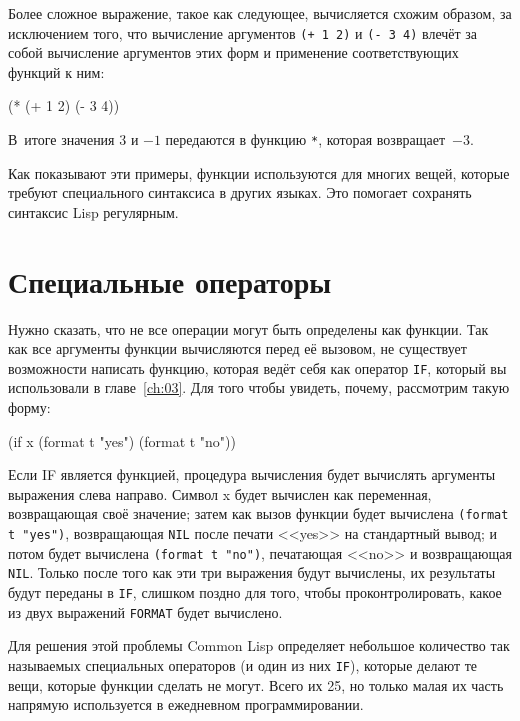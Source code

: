 Более сложное выражение, такое как следующее, вычисляется схожим образом, за исключением
того, что вычисление аргументов \lstinline{(+ 1 2)} и \lstinline{(- 3 4)} влечёт за собой
вычисление аргументов этих форм и применение соответствующих функций к ним:

\begin{myverb}
(* (+ 1 2) (- 3 4))
\end{myverb}

В~итоге значения $3$ и $-1$ передаются в функцию \lstinline{*}, которая возвращает~$-3$.

Как показывают эти примеры, функции используются для многих вещей, которые требуют
специального синтаксиса в других языках. Это помогает сохранять синтаксис Lisp регулярным.

\section{Специальные операторы}

Нужно сказать, что не все операции могут быть определены как функции. Так как все
аргументы функции вычисляются перед её вызовом, не существует возможности написать
функцию, которая ведёт себя как оператор \lstinline{IF}, который вы использовали в
главе~\ref{ch:03}. Для того чтобы увидеть, почему, рассмотрим такую форму:

\begin{myverb}
(if x (format t "yes") (format t "no"))
\end{myverb}

Если IF является функцией, процедура вычисления будет вычислять аргументы выражения слева
направо. Символ x будет вычислен как переменная, возвращающая своё значение; затем как
вызов функции будет вычислена \lstinline{(format t "yes")}, возвращающая \lstinline{NIL} после
печати <<yes>> на стандартный вывод; и потом будет вычислена \lstinline{(format t "no")}, печатающая
<<no>> и возвращающая \lstinline{NIL}. Только после того как эти три выражения будут
вычислены, их результаты будут переданы в \lstinline{IF}, слишком поздно для того, чтобы
проконтролировать, какое из двух выражений \lstinline{FORMAT} будет вычислено.

Для решения этой проблемы Common Lisp определяет небольшое количество так называемых
специальных операторов (и один из них \lstinline{IF}), которые делают те вещи, которые
функции сделать не могут. Всего их 25, но только малая их часть напрямую используется в
ежедневном программировании.

